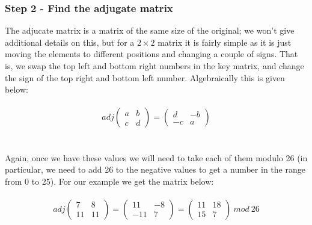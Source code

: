 \documentclass[Lau,binding=0.6cm,oneside]{sapthesis}
\begin{document}
\subsubsection{Step 2 - Find the adjugate matrix}
The adjucate matrix is a matrix of the same size of the original; we won't give additional details on this, but for a $2 \times 2$ matrix it is fairly simple as it is just moving the elements to different positions and changing a couple of signs. That is, we swap the top left and bottom right numbers in the key matrix, and change the sign of the top right and bottom left number. Algebraically this is given below:\\\\
\begin{equation}
adj\begin{pmatrix}a&b\\c&d\end{pmatrix} = \begin{pmatrix}d&-b\\-c&a\end{pmatrix}
\end{equation}
\ \\\\
Again, once we have these values we will need to take each of them modulo 26 (in particular, we need to add 26 to the negative values to get a number in the range from 0 to 25). For our example we get the matrix below:\\\\
\begin{equation}
adj \begin{pmatrix} 7 & 8 \\ 11 & 11 \end{pmatrix} = 
\begin{pmatrix} 11 & -8 \\ -11 & 7 \end{pmatrix} = 
\begin{pmatrix} 11 & 18 \\ 15 & 7 \end{pmatrix} \ mod \ 26
\end{equation}
\ \\
\end{document}

